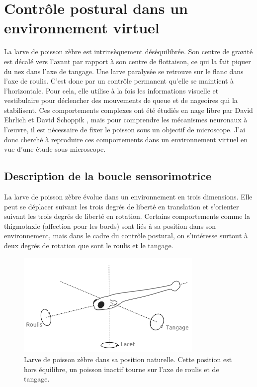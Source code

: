 \chapter[Contrôle postural en VR]{Contrôle postural dans un environnement virtuel}\label{chapII}

La larve de poisson zèbre est intrinsèquement déséquilibrée. Son centre de gravité est décalé vers l'avant par rapport à son centre de flottaison, ce qui la fait piquer du nez dans l'axe de tangage. Une larve paralysée se retrouve sur le flanc dans l'axe de roulis. C'est donc par un contrôle permanent qu'elle se maintient à l'horizontale. Pour cela, elle utilise à la fois les informations visuelle et vestibulaire pour déclencher des mouvements de queue et de nageoires qui la stabilisent. Ces comportements complexes ont été étudiés en nage libre par David Ehrlich et David Schoppik \cite{ehrlich_control_2017}\cite{ehrlich_balance_2018}\cite{ehrlich_primal_2019}, mais pour comprendre les mécanismes neuronaux à l'œuvre, il est nécessaire de fixer le poisson sous un objectif de microscope. J'ai donc cherché à reproduire ces comportements dans un environnement virtuel en vue d'une étude sous microscope.

\section{Description de la boucle sensorimotrice}

La larve de poisson zèbre évolue dans un environnement en trois dimensions. Elle peut se déplacer suivant les trois degrés de liberté en translation et s'orienter suivant les trois degrés de liberté en rotation. Certains comportements comme la thigmotaxie (affection pour les bords) sont liés à sa position dans son environnement, mais dans le cadre du contrôle postural, on s'intéresse surtout à deux degrés de rotation que sont le roulis et le tangage.

\begin{figure}
\centering
\includegraphics[width=0.8\textwidth]{./files/fish.png}
\caption{Larve de poisson zèbre dans sa position naturelle. Cette position est hors équilibre, un poisson inactif tourne sur l'axe de roulis et de tangage.}
\end{figure}


